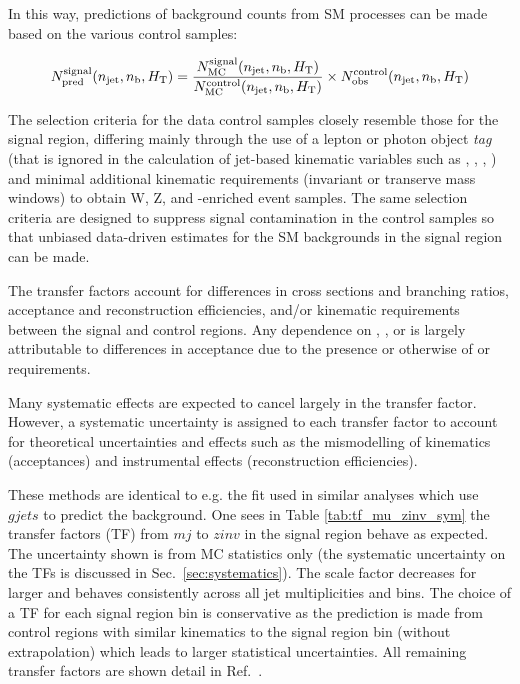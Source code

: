 In this way, predictions of background counts from SM processes can be
made based on the various control samples:

\begin{equation}
  \label{equ:pred-method}
  N_{\textrm{pred}}^{\rm signal}(n_{\text{jet}},n_{\text{b}},\mbox{$H_\text{T}$}) = \frac{N_{\rm MC}^{\rm
      signal}(n_{\text{jet}},n_{\text{b}},\mbox{$H_\text{T}$})}{N_{\rm MC}^{\rm
      control}(n_{\text{jet}},n_{\text{b}},\mbox{$H_\text{T}$})} \times N_{\textrm{obs}}^{\rm
    control}(n_{\text{jet}},n_{\text{b}},\mbox{$H_\text{T}$})   
\end{equation}


The selection criteria for the data control samples closely resemble
those for the signal region, differing mainly through the use of a
lepton or photon object {\it tag} (that is ignored in the calculation
of jet-based kinematic variables such as \scalht, \mht, \alphat, \etc)
and minimal additional kinematic requirements (\eg invariant or
transerve mass windows) to obtain W, Z, and \ttbar-enriched event
samples. The same selection criteria are designed to suppress signal
contamination in the control samples so that unbiased data-driven
estimates for the SM backgrounds in the signal region can be
made. 

The transfer factors account for differences in cross sections and
branching ratios, acceptance and reconstruction efficiencies, and/or
kinematic requirements between the signal and control regions. Any
dependence on \njet, \nb, or \HT is largely attributable to
differences in acceptance due to the presence or otherwise of \alphat
or \mht requirements.

Many systematic effects are expected to cancel largely in the transfer
factor. However, a systematic uncertainty is assigned to each transfer
factor to account for theoretical uncertainties and effects such as
the mismodelling of kinematics (\eg acceptances) and instrumental
effects (\eg reconstruction efficiencies).

These methods are identical to e.g. the fit used in similar analyses which use $gjets$ to predict the \znunu background. 
One sees in Table \ref{tab:tf_mu_zinv_sym} the transfer factors (TF) from $mj$ to $zinv$ in the signal region behave as expected.
The uncertainty shown is from MC statistics only (the systematic uncertainty on the TFs is discussed in Sec.~\ref{sec:systematics}). 
The scale factor decreases for larger \HT and behaves consistently across all jet multiplicities and \HT bins. 
The choice of a TF for each signal region bin is conservative as the prediction is made from control regions with similar kinematics
to the signal region bin (without extrapolation) which leads to larger statistical uncertainties.
All remaining transfer factors are shown detail in Ref.~\cite{alphaTnote}. 

